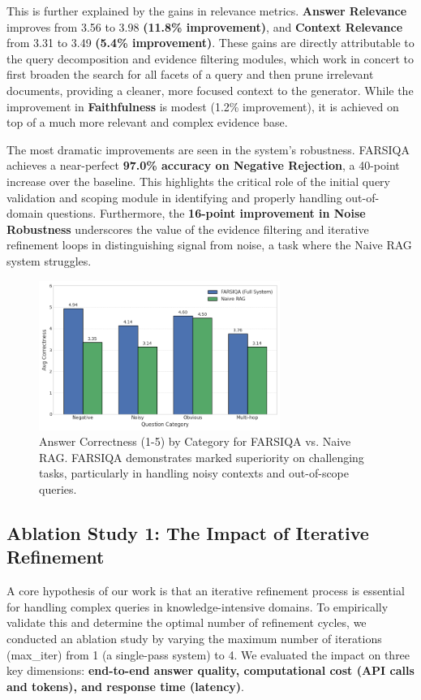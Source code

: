 \documentclass[11pt]{article}
\begin{document}
This is further explained by the gains in relevance metrics. \textbf{Answer Relevance} improves from 3.56 to 3.98 \textbf{(11.8\% improvement)}, and \textbf{Context Relevance} from 3.31 to 3.49 \textbf{(5.4\% improvement)}. These gains are directly attributable to the query decomposition and evidence filtering modules, which work in concert to first broaden the search for all facets of a query and then prune irrelevant documents, providing a cleaner, more focused context to the generator. While the improvement in \textbf{Faithfulness} is modest (1.2\% improvement), it is achieved on top of a much more relevant and complex evidence base.

The most dramatic improvements are seen in the system's robustness. FARSIQA achieves a near-perfect \textbf{97.0\% accuracy on Negative Rejection}, a 40-point increase over the baseline. This highlights the critical role of the initial query validation and scoping module in identifying and properly handling out-of-domain questions. Furthermore, the \textbf{16-point improvement in Noise Robustness} underscores the value of the evidence filtering and iterative refinement loops in distinguishing signal from noise, a task where the Naive RAG system struggles.

\begin{figure}[t]
\centering
\includegraphics[width=0.7\textwidth]{figure_2.png}
\caption{Answer Correctness (1-5) by Category for FARSIQA vs. Naive RAG. FARSIQA demonstrates marked superiority on challenging tasks, particularly in handling noisy contexts and out-of-scope queries.}
\label{fig:performance-by-category}
\end{figure}

\subsection{Ablation Study 1: The Impact of Iterative Refinement}

A core hypothesis of our work is that an iterative refinement process is essential for handling complex queries in knowledge-intensive domains. To empirically validate this and determine the optimal number of refinement cycles, we conducted an ablation study by varying the maximum number of iterations (max\_iter) from 1 (a single-pass system) to 4. We evaluated the impact on three key dimensions: \textbf{end-to-end answer quality, computational cost (API calls and tokens), and response time (latency)}.
\end{document}
